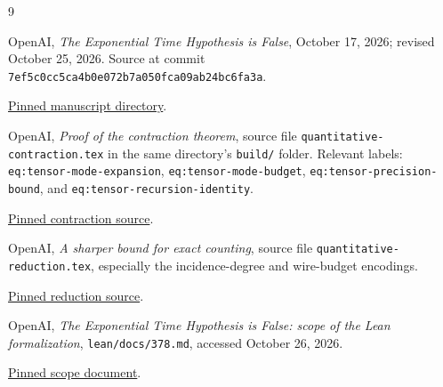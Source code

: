 \documentclass[11pt]{article}
\theoremstyle{remark}
\begin{document}
\begin{thebibliography}{9}
\raggedright
{}
OpenAI, \emph{The Exponential Time Hypothesis is False}, October 17, 2026; revised October 25, 2026. Source at commit \texttt{7ef5c0cc5ca4b0e072b7a050fca09ab24bc6fa3a}.\par
\href{https://github.com/openai/math/tree/7ef5c0cc5ca4b0e072b7a050fca09ab24bc6fa3a/preprints/The-Exponential-Time-Hypothesis-is-False-October-25-2026}{Pinned manuscript directory}.

OpenAI, \emph{Proof of the contraction theorem}, source file \texttt{quantitative-contraction.tex} in the same directory's \texttt{build/} folder. Relevant labels: \texttt{eq:tensor-mode-expansion}, \texttt{eq:tensor-mode-budget}, \texttt{eq:tensor-precision-bound}, and \texttt{eq:tensor-recursion-identity}.\par
\href{https://github.com/openai/math/blob/7ef5c0cc5ca4b0e072b7a050fca09ab24bc6fa3a/preprints/The-Exponential-Time-Hypothesis-is-False-October-25-2026/build/quantitative-contraction.tex}{Pinned contraction source}.

OpenAI, \emph{A sharper bound for exact counting}, source file \texttt{quantitative-reduction.tex}, especially the incidence-degree and wire-budget encodings.\par
\href{https://github.com/openai/math/blob/7ef5c0cc5ca4b0e072b7a050fca09ab24bc6fa3a/preprints/The-Exponential-Time-Hypothesis-is-False-October-25-2026/build/quantitative-reduction.tex}{Pinned reduction source}.

OpenAI, \emph{The Exponential Time Hypothesis is False: scope of the Lean formalization}, \texttt{lean/docs/378.md}, accessed October 26, 2026.\par
\href{https://github.com/openai/math/blob/7ef5c0cc5ca4b0e072b7a050fca09ab24bc6fa3a/lean/docs/378.md}{Pinned scope document}.
\end{thebibliography}
\end{document}
